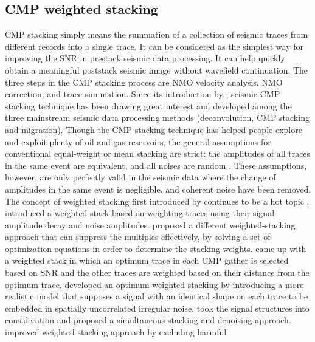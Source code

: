  \subsection{CMP weighted stacking}
CMP stacking simply means the summation of a collection of
seismic traces from different records into a single trace. It can 
be considered as the simplest way for improving the SNR in prestack seismic data processing. It can help quickly obtain a meaningful poststack seismic image without wavefield continuation. The three steps in the CMP stacking process are NMO velocity analysis, NMO correction, and trace summation. Since its introduction by \cite{Mayne62}, seismic CMP
stacking technique has been drawing great interest and
developed among the three mainstream seismic data
processing methods (deconvolution, CMP stacking and
migration).  Though the CMP stacking technique has helped people explore
and exploit plenty of oil and gas reservoirs, the general
assumptions for conventional equal-weight or mean
stacking are strict: the amplitudes of all traces in the same event are equivalent, and all noises are random \cite[]{Rashed14}. These
assumptions, however, are only perfectly valid in the
seismic data where the change of amplitudes in the same event is negligible, and
coherent noise have been removed. The concept of
weighted stacking first introduced by \cite{Robinson70}
continues to be a hot topic \cite[]{Anderson90,Schoenberger96,Rashed02,Tyapkin05,Neelamani06,Rashed08,Liu09}. \cite{Anderson90} introduced a weighted stack based on weighting traces using their signal amplitude decay and noise amplitudes. \cite{Schoenberger96} proposed a different weighted-stacking approach that can suppress the multiples effectively, by solving a set of optimization equations in order to determine the stacking weights. \cite{Rashed02} came up with a weighted stack in which an optimum trace in each CMP gather is selected based on SNR and the other traces are weighted based on their distance from the optimum trace. \cite{Tyapkin05} developed an optimum-weighted stacking by introducing a more realistic model that supposes a signal with an identical shape on each trace to be embedded in spatially uncorrelated irregular noise. \cite{Neelamani06} took the signal structures into consideration and proposed a simultaneous stacking and denoising approach. \cite{Rashed08} improved weighted-stacking approach by excluding harmful
